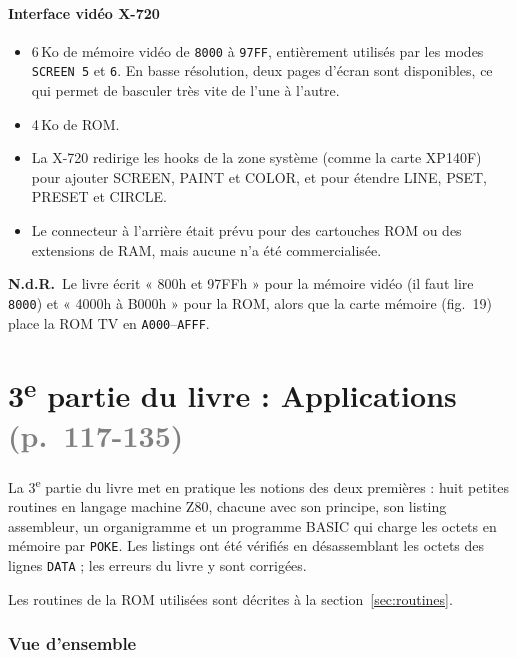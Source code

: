 \documentclass[a4paper,10pt]{article}
\newcommand{\hex}[1]{\texttt{#1}}
\newcommand{\pg}[1]{\texorpdfstring{\textcolor{gray}{\small(p.~#1)}}{}}
\newcommand{\nota}[1]{\textcolor{red!60!black}{\small\textbf{N.d.R.}~#1}}
\begin{document}
\subsection{Interface vidéo X-720}
\begin{itemize}
  \item 6\,Ko de mémoire vidéo de \hex{8000} à \hex{97FF}, entièrement
        utilisés par les modes \texttt{SCREEN 5} et \texttt{6}. En basse
        résolution, deux pages d'écran sont disponibles, ce qui permet de
        basculer très vite de l'une à l'autre.
  \item 4\,Ko de ROM.
  \item La X-720 redirige les hooks de la zone système (comme la carte
        XP140F) pour ajouter SCREEN, PAINT et COLOR, et pour étendre LINE,
        PSET, PRESET et CIRCLE.
  \item Le connecteur à l'arrière était prévu pour des cartouches ROM ou des
        extensions de RAM, mais aucune n'a été commercialisée.
\end{itemize}
\nota{Le livre écrit « 800h et 97FFh » pour la mémoire vidéo (il faut lire
\hex{8000}) et « 4000h à B000h » pour la ROM, alors que la carte mémoire
(fig.~19) place la ROM TV en \hex{A000}--\hex{AFFF}.}

\newpage
\part*{3\textsuperscript{e} partie du livre : Applications \pg{117-135}}

La 3\textsuperscript{e} partie du livre met en pratique les notions des deux
premières : huit petites routines en langage machine Z80, chacune avec son
principe, son listing assembleur, un organigramme et un programme BASIC qui
charge les octets en mémoire par \texttt{POKE}. Les listings ont été
vérifiés en désassemblant les octets des lignes \texttt{DATA} ; les erreurs
du livre y sont corrigées.

Les routines de la ROM utilisées sont décrites à la section~\ref{sec:routines}.

\section{Vue d'ensemble}
\end{document}
